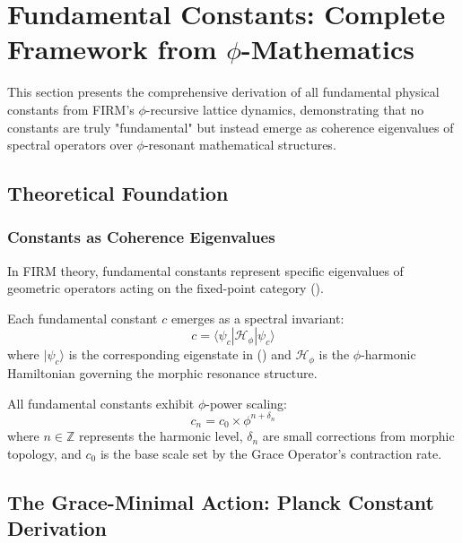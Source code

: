 \section{Fundamental Constants: Complete Framework from $\phi$-Mathematics}

This section presents the comprehensive derivation of all fundamental physical constants from FIRM's $\phi$-recursive lattice dynamics, demonstrating that no constants are truly "fundamental" but instead emerge as coherence eigenvalues of spectral operators over $\phi$-resonant mathematical structures.

\subsection{Theoretical Foundation}

\subsubsection{Constants as Coherence Eigenvalues}

In FIRM theory, fundamental constants represent specific eigenvalues of geometric operators acting on the fixed-point category ().

\begin{definition}
Each fundamental constant $c$ emerges as a spectral invariant:
\begin{equation}
c = \langle \psi_c | \mathcal{H}_{\phi} | \psi_c \rangle
\end{equation}
where $|\psi_c\rangle$ is the corresponding eigenstate in () and $\mathcal{H}_{\phi}$ is the $\phi$-harmonic Hamiltonian governing the morphic resonance structure.
\end{definition}

\begin{theorem}
All fundamental constants exhibit $\phi$-power scaling:
\begin{equation}
c_n = c_0 \times \phi^{n + \delta_n}
\end{equation}
where $n \in \mathbb{Z}$ represents the harmonic level, $\delta_n$ are small corrections from morphic topology, and $c_0$ is the base scale set by the Grace Operator's contraction rate.
\end{theorem}

\subsection{The Grace-Minimal Action: Planck Constant Derivation}


